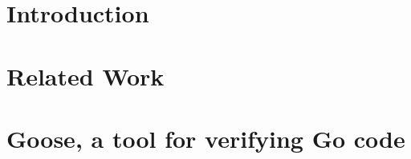 \documentclass[11pt,twoside,final]{mitthesis}
\begin{document}




\begin{abstractpage}

\end{abstractpage}
\cleardoublepage


%

\tableofcontents
\listoffigures


\chapter{Introduction}%
\label{sec:introduction}


\chapter{Related Work}%
\label{sec:related}


\chapter{Goose, a tool for verifying Go code}%
\label{sec:goose}


%
\end{document}
